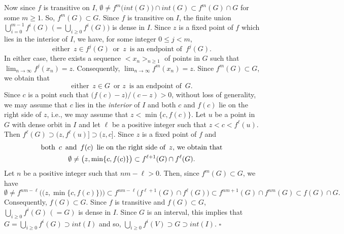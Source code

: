 \documentclass[12pt]{article}
\newcommand{\sq}{$\square$}
\begin{document}
Now since $f$ is transitive on $I$, $\emptyset \ne  f^m\big(int(G)\big) \cap int(G) \subset f^m(G) \cap G$ for some $m \ge 1$.  So, $f^m({G}) \subset {G}$.  Since $f$ is transitive on $I$, the finite union $\bigcup_{i=0}^{m-1} f^i(G)$ $\bigl(= \bigcup_{i\ge0} f^i(G)\bigr)$ is dense in $I$.  Since $z$ is a fixed point of $f$ which lies in the interior of $I$, we have, for some integer $0 \le j < m$,$$\text{either} \,\,\, z \in f^j(G) \,\,\, \text{or} \,\,\, z \,\,\, \text{is an endpoint of} \,\,\, f^j(G).$$In either case, there exists a sequence $<x_n>_{n \ge 1}$ of points in $G$ such that $\lim_{n \to \infty} f^j(x_n) = z$.  Consequently, $\lim_{n \to \infty} f^m(x_n) = z$.  Since $f^m(G) \subset G$, we obtain that 
$$
\text{either} \,\,\, z \in G \,\,\, \text{or} \,\, z \,\,\, \text{is an endpoint of} \,\,\, G.
$$
\indent Since $c$ is a point such that $\big(f(c) - z\big)/(c - z) > 0$, without loss of generality, we may assume that $c$ lies in the {\it interior} of $I$ and both $c$ and $f(c)$ lie on the right side of $z$, i.e., we may assume that $z < \min \big\{ c, f(c) \big\}$.  Let $u$ be a point in $G$ with dense orbit in $I$ and let $\ell$ be a positive integer such that $z < c < f^\ell(u)$.  Then $f^\ell(G) \supset \big(z, f^\ell(u)\big] \supset (z, c]$.  Since $z$ is a fixed point of $f$ and
\begin{multline*}
$$
\text{both} \,\,\, c \,\,\, \text{and} \,\,\, f(c) \,\,\, \text{lie on the right side of} \,\,\, z, \, \text{we obtain that} \\
\emptyset \ne \big(z, \min \{ c, f(c) \}\big) \subset f^{\ell+1}(G) \cap f^\ell(G). 
$$
\end{multline*}
Let $n$ be a positive integer such that $nm - \ell > 0$.  Then, since $f^m(G) \subset G$, we have 
$$
\emptyset \ne f^{nm-\ell}\bigg(\big(z, \min \{ c, f(c) \}\big)\bigg) \subset f^{nm-\ell}\bigg(f^{\ell+1}(G) \cap f^\ell(G)\bigg) \subset f^{nm+1}(G) \cap f^{nm}(G) \subset f(G) \cap G. 
$$
Consequently, $f(G) \subset G$.  Since $f$ is transitive and $f(G) \subset G$, $\bigcup_{i \ge 0} f^i(G) \, (= G)$ is dense in $I$.  Since $G$ is an interval, this implies that $G = \bigcup_{i \ge 0} f^i(G) \supset int(I)$ and so, $\bigcup_{i \ge 0} f^i(V) \supset G \supset int(I)$.    
\hfill\sq
\end{document}
